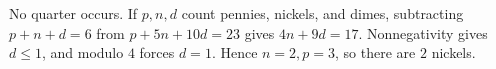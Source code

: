No quarter occurs. If $p,n,d$ count pennies, nickels, and dimes, subtracting $p+n+d=6$ from $p+5n+10d=23$ gives $4n+9d=17$. Nonnegativity gives $d\le1$, and modulo $4$ forces $d=1$. Hence $n=2,p=3$, so there are $\boxed2$ nickels.
